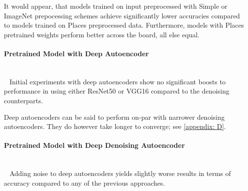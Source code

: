 It would appear, that models trained on input preprocessed with Simple or ImageNet prepocessing schemes achieve significantly lower accuracies compared to models trained on Places preprocessed data. 
Furthermore, models with Places pretrained weights perform better across the board, all else equal. 


\paragraph{Pretrained Model with Deep Autoencoder} \\~
Initial experiments with deep autoencoders show no significant boosts to performance in using either ResNet50 or VGG16 compared to the denoising counterparts. 
\begin{table}[H]
  \centering
\end{table}
Deep autoencoders can be said to perform on-par with narrower denoising autoencoders. They do however take longer to converge; see \autoref{appendix: D}. 

\paragraph{Pretrained Model with Deep Denoising Autoencoder} \\~
Adding noise to deep autoencoders yields slightly worse results in terms of accuracy compared to any of the previous approaches. 

